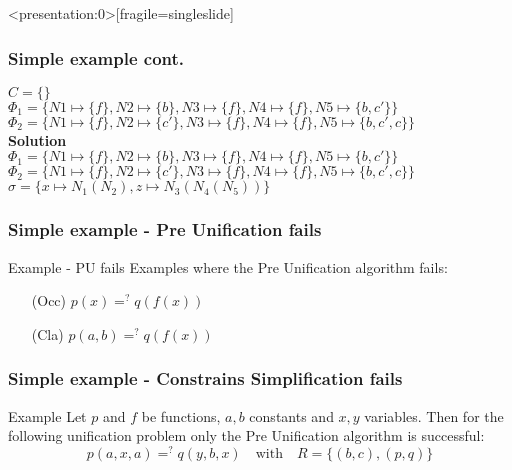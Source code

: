 		\begin{frame}<presentation:0>[fragile=singleslide]
	\frametitle{Simple example cont.}
	\(C=\{\}\)\\
	\(\Phi_1=\{N1\mapsto \{f\}, N2\mapsto \{b\}, N3\mapsto \{f\} , N4\mapsto \{f\},N5\mapsto \{b,c'\}\}\)\\
	\(\Phi_2=\{N1\mapsto \{f\}, N2\mapsto \{c'\}, N3\mapsto \{f\} , N4\mapsto \{f\},N5\mapsto \{b,c',c\}\}\)\\
	
	\vspace{0.5cm}
	\textbf{Solution}\\
	\(\Phi_1=\{N1\mapsto \{f\}, N2\mapsto \{b\}, N3\mapsto \{f\} , N4\mapsto \{f\},N5\mapsto \{b,c'\}\}\)\\
	\(\Phi_2=\{N1\mapsto \{f\}, N2\mapsto \{c'\}, N3\mapsto \{f\} , N4\mapsto \{f\},N5\mapsto \{b,c',c\}\}\)\\
	\(\sigma=\{x \mapsto N_1(N_2), z \mapsto N_3(N_4(N_5))\}\)\\
		\end{frame}
		
	\begin{frame}[fragile=singleslide]
	\frametitle{Simple example - Pre Unification fails}
	\begin{exampleblock}{Example - PU fails}
	Examples where the Pre Unification algorithm fails:
		\begin{itemize}
				\item [(Occ)] \(p(x) =^? q(f(x))\)
				\item [(Cla)] \(p(a,b) =^? q(f(x))\)
		\end{itemize}
	\end{exampleblock}
		\vspace{0.5cm}
		\end{frame}
	
	\begin{frame}[fragile=singleslide]
	\frametitle{Simple example - Constrains Simplification fails}		
	\begin{exampleblock}{Example}
	Let $p$ and $f$ be functions, $a,b$ constants and $x,y$ variables. Then for the following unification problem only the Pre Unification algorithm is successful:
	\[p(a,x,a) =^? q(y,b,x) \quad \text{with} \quad R=\{(b,c),(p,q)\}\]\\
	\end{exampleblock}
	\end{frame}
	

